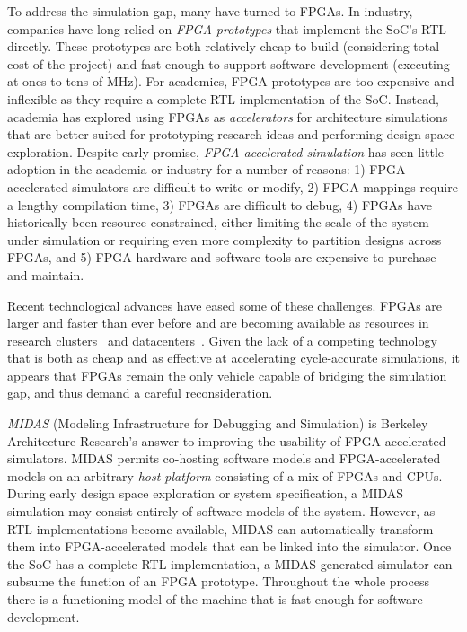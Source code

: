 To address the simulation gap, many have turned to FPGAs. In industry,
companies have long relied on \emph{FPGA prototypes} that implement the SoC's
RTL directly. These prototypes are both relatively cheap to build (considering
total cost of the project) and fast enough to support software development
(executing at ones to tens of MHz). For academics, FPGA prototypes are too
expensive and inflexible as they require a complete RTL implementation of the
SoC. Instead, academia has explored using FPGAs as \emph{accelerators} for
architecture simulations~\cite{fast, fame, hasim, protoflex,ramp} that are
better suited for prototyping research ideas and performing design space
exploration. Despite early promise, \emph{FPGA-accelerated simulation} has seen little adoption in the
academia or industry for a number of reasons: 1) FPGA-accelerated simulators
are difficult to write or modify, 2) FPGA mappings require a lengthy
compilation time, 3) FPGAs are difficult to debug, 4) FPGAs have historically
been resource constrained, either limiting the scale of the system under
simulation or requiring even more complexity to partition designs across FPGAs,
and 5) FPGA hardware and software tools are expensive to purchase and maintain.

Recent technological advances have eased some of these challenges. FPGAs are
larger and faster than ever before and are becoming available as resources in
research clusters~\cite{catapultannounce} and datacenters~\cite{amazonf1}.
Given the lack of a competing technology that is both as cheap and as effective
at accelerating cycle-accurate simulations, it appears that FPGAs remain the
only vehicle capable of bridging the simulation gap, and thus demand a careful
reconsideration.

\emph{MIDAS} (Modeling Infrastructure for Debugging and Simulation) is Berkeley
Architecture Research's answer to improving the usability of FPGA-accelerated
simulators. MIDAS permits co-hosting software models and FPGA-accelerated
models on an arbitrary \emph{host-platform} consisting of a mix of FPGAs and
CPUs.  During early design space exploration or system specification, a MIDAS
simulation may consist entirely of software models of the system.  However, as
RTL implementations become available, MIDAS can automatically transform them
into FPGA-accelerated models that can be linked into the simulator. Once the
SoC has a complete RTL implementation, a MIDAS-generated simulator can subsume
the function of an FPGA prototype. Throughout the whole process there is a
functioning model of the machine that is fast enough for software development.

